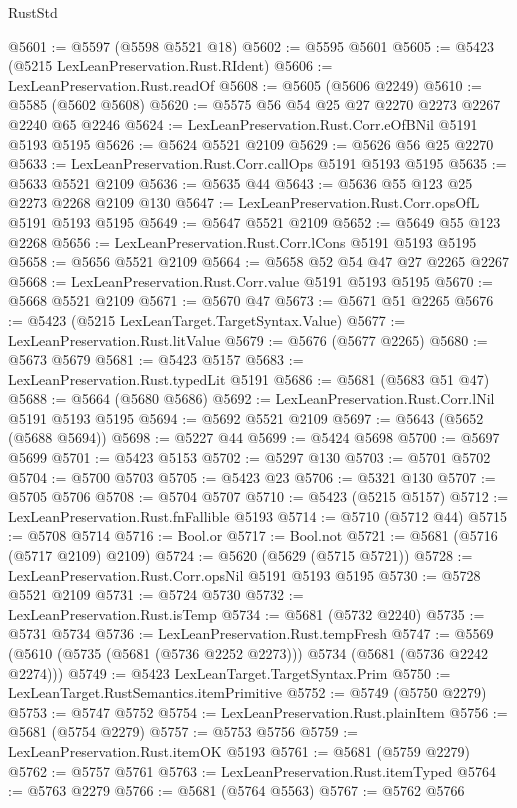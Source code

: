 \begin{lexlean}{RustStd}
\begin{coremodule}
@5601 := @5597 (@5598 @5521 @18)
@5602 := @5595 @5601
@5605 := @5423 (@5215 LexLeanPreservation.Rust.RIdent)
@5606 := LexLeanPreservation.Rust.readOf
@5608 := @5605 (@5606 @2249)
@5610 := @5585 (@5602 @5608)
@5620 := @5575 @56 @54 @25 @27 @2270 @2273 @2267 @2240 @65 @2246
@5624 := LexLeanPreservation.Rust.Corr.eOfBNil @5191 @5193 @5195
@5626 := @5624 @5521 @2109
@5629 := @5626 @56 @25 @2270
@5633 := LexLeanPreservation.Rust.Corr.callOps @5191 @5193 @5195
@5635 := @5633 @5521 @2109
@5636 := @5635 @44
@5643 := @5636 @55 @123 @25 @2273 @2268 @2109 @130
@5647 := LexLeanPreservation.Rust.Corr.opsOfL @5191 @5193 @5195
@5649 := @5647 @5521 @2109
@5652 := @5649 @55 @123 @2268
@5656 := LexLeanPreservation.Rust.Corr.lCons @5191 @5193 @5195
@5658 := @5656 @5521 @2109
@5664 := @5658 @52 @54 @47 @27 @2265 @2267
@5668 := LexLeanPreservation.Rust.Corr.value @5191 @5193 @5195
@5670 := @5668 @5521 @2109
@5671 := @5670 @47
@5673 := @5671 @51 @2265
@5676 := @5423 (@5215 LexLeanTarget.TargetSyntax.Value)
@5677 := LexLeanPreservation.Rust.litValue
@5679 := @5676 (@5677 @2265)
@5680 := @5673 @5679
@5681 := @5423 @5157
@5683 := LexLeanPreservation.Rust.typedLit @5191
@5686 := @5681 (@5683 @51 @47)
@5688 := @5664 (@5680 @5686)
@5692 := LexLeanPreservation.Rust.Corr.lNil @5191 @5193 @5195
@5694 := @5692 @5521 @2109
@5697 := @5643 (@5652 (@5688 @5694))
@5698 := @5227 @44
@5699 := @5424 @5698
@5700 := @5697 @5699
@5701 := @5423 @5153
@5702 := @5297 @130
@5703 := @5701 @5702
@5704 := @5700 @5703
@5705 := @5423 @23
@5706 := @5321 @130
@5707 := @5705 @5706
@5708 := @5704 @5707
@5710 := @5423 (@5215 @5157)
@5712 := LexLeanPreservation.Rust.fnFallible @5193
@5714 := @5710 (@5712 @44)
@5715 := @5708 @5714
@5716 := Bool.or
@5717 := Bool.not
@5721 := @5681 (@5716 (@5717 @2109) @2109)
@5724 := @5620 (@5629 (@5715 @5721))
@5728 := LexLeanPreservation.Rust.Corr.opsNil @5191 @5193 @5195
@5730 := @5728 @5521 @2109
@5731 := @5724 @5730
@5732 := LexLeanPreservation.Rust.isTemp
@5734 := @5681 (@5732 @2240)
@5735 := @5731 @5734
@5736 := LexLeanPreservation.Rust.tempFresh
@5747 := @5569 (@5610 (@5735 (@5681 (@5736 @2252 @2273))) @5734 (@5681 (@5736 @2242 @2274)))
@5749 := @5423 LexLeanTarget.TargetSyntax.Prim
@5750 := LexLeanTarget.RustSemantics.itemPrimitive
@5752 := @5749 (@5750 @2279)
@5753 := @5747 @5752
@5754 := LexLeanPreservation.Rust.plainItem
@5756 := @5681 (@5754 @2279)
@5757 := @5753 @5756
@5759 := LexLeanPreservation.Rust.itemOK @5193
@5761 := @5681 (@5759 @2279)
@5762 := @5757 @5761
@5763 := LexLeanPreservation.Rust.itemTyped
@5764 := @5763 @2279
@5766 := @5681 (@5764 @5563)
@5767 := @5762 @5766

\end{coremodule}
\end{lexlean}
